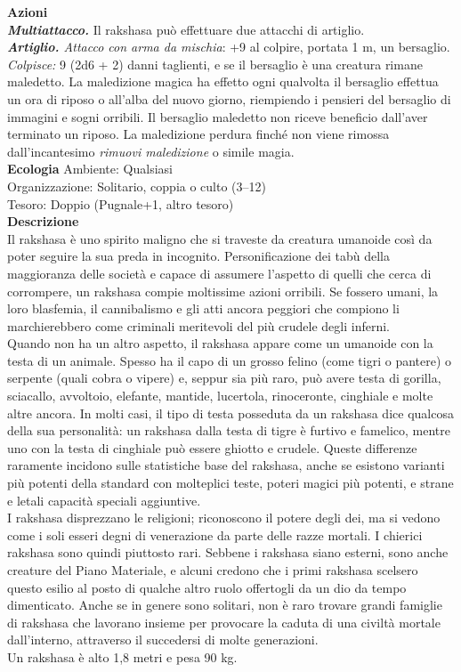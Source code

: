 \begin{multicols}{2}
\smallskip\textbf{Azioni}\\
\emph{\textbf{Multiattacco.}} Il rakshasa può effettuare due attacchi di artiglio.\\
\emph{\textbf{Artiglio.} Attacco con arma da mischia}: +9 al colpire, portata 1 m, un bersaglio.\\
\emph{Colpisce:} 9 (2d6 + 2) danni taglienti, e se il bersaglio è una creatura rimane maledetto. La maledizione magica ha effetto ogni qualvolta il bersaglio effettua un ora di riposo o all'alba del nuovo giorno, riempiendo i pensieri del bersaglio di immagini e sogni orribili. Il bersaglio maledetto non riceve beneficio dall'aver terminato un riposo. La maledizione perdura finché non viene rimossa dall'incantesimo \emph{rimuovi maledizione} o simile magia.\\
\textbf{Ecologia}
Ambiente: Qualsiasi\\
Organizzazione: Solitario, coppia o culto (3–12)\\
Tesoro: Doppio (Pugnale+1, altro tesoro)\\
\textbf{Descrizione}\\
Il rakshasa è uno spirito maligno che si traveste da creatura umanoide così da poter seguire la sua preda in incognito. Personificazione dei tabù della maggioranza delle società e capace di assumere l'aspetto di quelli che cerca di corrompere, un rakshasa compie moltissime azioni orribili. Se fossero umani, la loro blasfemia, il cannibalismo e gli atti ancora peggiori che compiono li marchierebbero come criminali meritevoli del più crudele degli inferni.\\
Quando non ha un altro aspetto, il rakshasa appare come un umanoide con la testa di un animale. Spesso ha il capo di un grosso felino (come tigri o pantere) o serpente (quali cobra o vipere) e, seppur sia più raro, può avere testa di gorilla, sciacallo, avvoltoio, elefante, mantide, lucertola, rinoceronte, cinghiale e molte altre ancora. In molti casi, il tipo di testa posseduta da un rakshasa dice qualcosa della sua personalità: un rakshasa dalla testa di tigre è furtivo e famelico, mentre uno con la testa di cinghiale può essere ghiotto e crudele. Queste differenze raramente incidono sulle statistiche base del rakshasa, anche se esistono varianti più potenti della standard con molteplici teste, poteri magici più potenti, e strane e letali capacità speciali aggiuntive.\\
I rakshasa disprezzano le religioni; riconoscono il potere degli dei, ma si vedono come i soli esseri degni di venerazione da parte delle razze mortali. I chierici rakshasa sono quindi piuttosto rari. Sebbene i rakshasa siano esterni, sono anche creature del Piano Materiale, e alcuni credono che i primi rakshasa scelsero questo esilio al posto di qualche altro ruolo offertogli da un dio da tempo dimenticato. Anche se in genere sono solitari, non è raro trovare grandi famiglie di rakshasa che lavorano insieme per provocare la caduta di una civiltà mortale dall'interno, attraverso il succedersi di molte generazioni.\\
Un rakshasa è alto 1,8 metri e pesa 90 kg.\\


\end{multicols}
